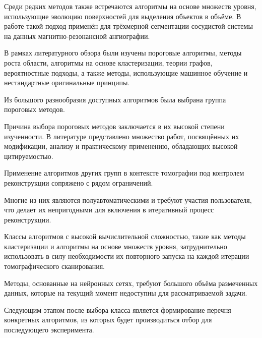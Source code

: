 Среди редких методов также встречаются алгоритмы на основе множеств уровня, использующие эволюцию поверхностей для выделения объектов в объёме. В работе \cite{farag20043d} такой подход применён для трёхмерной сегментации сосудистой системы на данных магнитно-резонансной ангиографии.

В рамках литературного обзора были изучены пороговые алгоритмы, методы роста области, алгоритмы на основе кластеризации, теории графов, вероятностные подходы, а также методы, использующие машинное обучение и нестандартные оригинальные принципы.

Из большого разнообразия доступных алгоритмов была выбрана группа пороговых методов.

Причина выбора пороговых методов заключается в их высокой степени изученности. В литературе представлено множество работ, посвящённых их модификации, анализу и практическому применению, обладающих высокой цитируемостью.

Применение алгоритмов других групп в контексте томографии под контролем реконструкции сопряжено с рядом ограничений. 

Многие из них являются полуавтоматическими и требуют участия пользователя, что делает их непригодными для включения в итеративный процесс реконструкции. 

Классы алгоритмов с высокой вычислительной сложностью, такие как методы кластеризации и алгоритмы на основе множеств уровня, затруднительно использовать в силу необходимости их повторного запуска на каждой итерации томографического сканирования. 

Методы, основанные на нейронных сетях, требуют большого объёма размеченных данных, которые на текущий момент недоступны для рассматриваемой задачи.

Следующим этапом после выбора класса является формирование перечня конкретных алгоритмов, из которых будет производиться отбор для последующего эксперимента.
